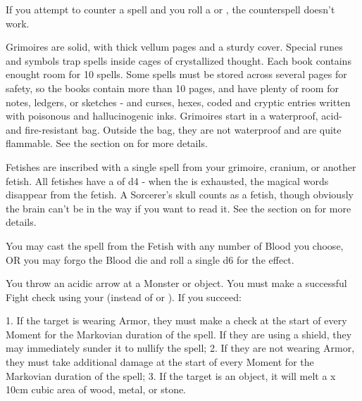 {If you attempt to counter a spell and you roll a
 or , the
counterspell doesn't work. 



Grimoires are solid, with thick vellum pages and a sturdy cover. Special
runes and symbols trap spells inside cages of crystallized thought. Each
book contains enought room for 10 spells. Some spells must be stored across
several pages for safety, so the books contain more than 10 pages, and have
plenty of room for notes, ledgers, or sketches - and curses, hexes, coded
and cryptic entries written with poisonous and hallucinogenic inks.
Grimoires start in a waterproof, acid- and fire-resistant bag. Outside the
bag, they are not waterproof and are quite flammable. See the section on
 for more details.


Fetishes are inscribed with a single spell from your grimoire, cranium, or
another fetish.  All fetishes have a \UD of d4 - when the \UD is exhausted,
the magical words disappear from the fetish.  A Sorcerer's skull counts as a
fetish, though obviously the brain can't be in the way if you want to read
it.  See the section on  for more
details.

You may cast the spell from the Fetish with any number of Blood you choose,
OR you may forgo the Blood die and roll a single d6 for the effect.  

\newpage


\SPELL[
  Name=Acid Arrow,
  Link=wizardry-acid-arrow,
  Paradigm=Elements,
  Save=N,
  Duration=0/Markovian,
  Counter=None,
  Keywords=None,
  Target=Nearby or Far-Away Monster or Object
]

You throw an acidic arrow at a Monster or object. You must make a successful
Fight check using your \INT (instead of \VIG or \DEX).  If you succeed: 

1. If the target is wearing Armor, they must make a \UD check at the start
of every Moment for the Markovian duration of the spell.  If they are using
a shield, they may immediately sunder it to nullify the spell; 
2. If they are not wearing Armor, they must take \DICE additional damage at
the start of every Moment for the Markovian duration of the spell; 
3. If the target is an object, it will melt a \DICE x 10cm cubic area of
wood, metal, or stone.  

}

